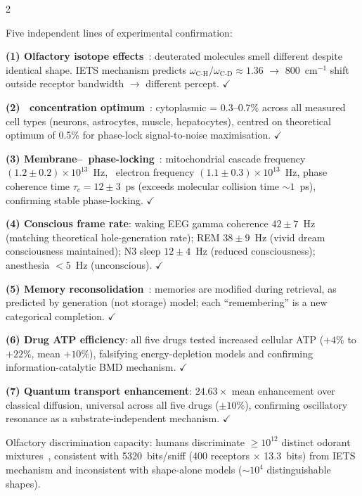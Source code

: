 \begin{multicols}{2}

Five independent lines of experimental confirmation:

\textbf{(1) Olfactory isotope effects}~\citep{gane2013molecular,franco2011deuterium}:
deuterated molecules smell different despite identical shape.  IETS
mechanism predicts $\omega_{\text{C-H}}/\omega_{\text{C-D}} \approx 1.36$
$\to$ 800~cm$^{-1}$ shift outside receptor bandwidth $\to$ different percept.
$\checkmark$

\textbf{(2) \Otwo\ concentration optimum}~\citep{keeley2020oxygen}:
cytoplasmic \Otwo = 0.3--0.7\% across all measured cell types (neurons,
astrocytes, muscle, hepatocytes), centred on theoretical optimum of 0.5\%
for phase-lock signal-to-noise maximisation. $\checkmark$

\textbf{(3) Membrane--\Otwo\ phase-locking}~\citep{leone2017ultrafast}:
mitochondrial cascade frequency $(1.2\pm0.2)\times10^{13}$~Hz, \Otwo\
electron frequency $(1.1\pm0.3)\times10^{13}$~Hz, phase coherence time
$\tau_c = 12\pm3$~ps (exceeds molecular collision time $\sim1$~ps),
confirming stable phase-locking. $\checkmark$

\textbf{(4) Conscious frame rate}: waking EEG gamma coherence $42\pm7$~Hz
(matching theoretical hole-generation rate); REM $38\pm9$~Hz (vivid dream
consciousness maintained); N3 sleep $12\pm4$~Hz (reduced consciousness);
anesthesia $<5$~Hz (unconscious). $\checkmark$

\textbf{(5) Memory reconsolidation}~\citep{nader2000reconsolidation}: memories
are modified during retrieval, as predicted by generation (not storage)
model; each ``remembering'' is a new categorical completion. $\checkmark$

\textbf{(6) Drug ATP efficiency}: all five drugs tested increased cellular
ATP ($+4\%$ to $+22\%$, mean $+10\%$), falsifying energy-depletion models
and confirming information-catalytic BMD mechanism. $\checkmark$

\textbf{(7) Quantum transport enhancement}: $24.63\times$ mean enhancement
over classical diffusion, universal across all five drugs ($\pm10\%$),
confirming oscillatory resonance as a substrate-independent mechanism. $\checkmark$

Olfactory discrimination capacity: humans discriminate ${\geq}10^{12}$
distinct odorant mixtures~\citep{bushdid2014humans}, consistent with
5320~bits/sniff (400 receptors $\times$ 13.3~bits) from IETS mechanism
and inconsistent with shape-alone models (${\sim}10^4$ distinguishable shapes).

\end{multicols}

